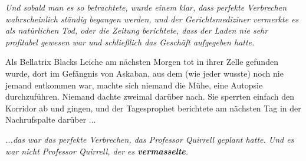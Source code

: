 \emph{Und sobald man es so betrachtete, wurde einem klar, dass perfekte
Verbrechen wahrscheinlich ständig begangen werden, und der Gerichtsmediziner
vermerkte es als natürlichen Tod, oder die Zeitung berichtete, dass der Laden
nie sehr profitabel gewesen war und schließlich das Geschäft aufgegeben hatte.}

Als Bellatrix Blacks Leiche am nächsten Morgen tot in ihrer Zelle gefunden
wurde, dort im Gefängnis von Askaban, aus dem (wie jeder wusste) noch nie jemand
entkommen war, machte sich niemand die Mühe, eine Autopsie durchzuführen.
Niemand dachte zweimal darüber nach. Sie sperrten einfach den Korridor ab und
gingen, und der Tagesprophet berichtete am nächsten Tag in der Nachrufspalte
darüber ...

\emph{...das war das perfekte Verbrechen, das Professor Quirrell geplant hatte.
Und es war nicht Professor Quirrell, der es \textbf{vermasselte}.}

